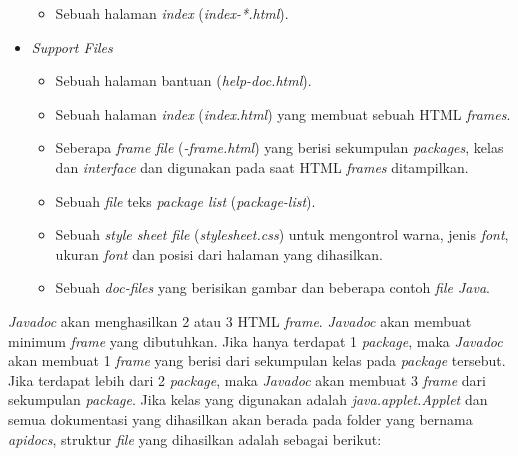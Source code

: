 \begin{itemize}
\begin{itemize}
		\item Sebuah halaman {\it index} ({\it index-*.html}).
	\end{itemize}
	\item {\it Support Files}
	\begin{itemize}
		\item Sebuah halaman bantuan ({\it help-doc.html}).
		\item Sebuah halaman {\it index} ({\it index.html}) yang membuat sebuah HTML {\it frames}.
		\item Seberapa {\it frame file} ({\it *-frame.html}) yang berisi sekumpulan {\it packages}, kelas dan {\it interface} dan digunakan pada saat HTML {\it frames} ditampilkan.
		\item Sebuah {\it file} teks {\it package list} ({\it package-list}).
		\item Sebuah {\it style sheet file} ({\it stylesheet.css}) untuk mengontrol warna, jenis {\it font}, ukuran {\it font} dan posisi dari halaman yang dihasilkan.
		\item Sebuah {\it doc-files} yang berisikan gambar dan beberapa contoh {\it file Java}.
	\end{itemize}
\end{itemize}
{\it Javadoc} akan menghasilkan 2 atau 3 HTML {\it frame}. {\it Javadoc} akan membuat minimum {\it frame} yang dibutuhkan. Jika hanya terdapat 1 {\it package}, maka {\it Javadoc} akan membuat 1 {\it frame} yang berisi dari sekumpulan kelas pada {\it package} tersebut. Jika terdapat lebih dari 2 {\it package}, maka {\it Javadoc} akan membuat 3 {\it frame} dari sekumpulan {\it package}. Jika kelas yang digunakan adalah {\it java.applet.Applet} dan semua dokumentasi yang dihasilkan akan berada pada folder yang bernama {\it apidocs}, struktur {\it file} yang dihasilkan adalah sebagai berikut:
